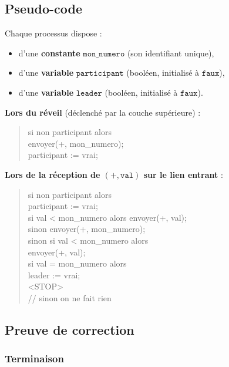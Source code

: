 \documentclass[12pt,a4paper]{article}
\theoremstyle{plain}
\theoremstyle{definition}
\theoremstyle{remark}
\newcommand{\monnum}{\mathtt{mon\_numero}}
\newcommand{\participant}{\mathtt{participant}}
\newcommand{\leader}{\mathtt{leader}}
\begin{document}
\subsection{Pseudo-code}

Chaque processus dispose :
\begin{itemize}[noitemsep]
  \item d'une \textbf{constante} $\monnum$ (son identifiant unique),
  \item d'une \textbf{variable} $\participant$ (booléen, initialisé à $\mathtt{faux}$),
  \item d'une \textbf{variable} $\leader$ (booléen, initialisé à $\mathtt{faux}$).
\end{itemize}

\medskip
\noindent\textbf{Lors du réveil} (déclenché par la couche supérieure) :
\begin{quote}\ttfamily
si non participant alors\\
\quad envoyer(+, mon\_numero);\\
\quad participant := vrai;
\end{quote}

\medskip
\noindent\textbf{Lors de la réception de $(+, \mathtt{val})$ sur le lien entrant} :
\begin{quote}\ttfamily
si non participant alors\\
\quad participant := vrai;\\
\quad si val < mon\_numero alors envoyer(+, val);\\
\quad sinon envoyer(+, mon\_numero);\\[0.5em]
sinon si val < mon\_numero alors\\
\quad envoyer(+, val);\\
si val = mon\_numero alors\\
\quad leader := vrai;\\
\quad <STOP>\\
// sinon on ne fait rien
\end{quote}

\subsection{Preuve de correction}

\subsubsection{Terminaison}
\end{document}
